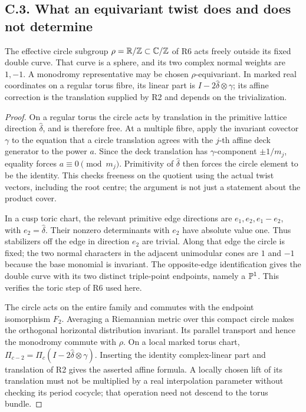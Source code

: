 

\subsection{C.3. What an equivariant twist does and does not determine}

\begin{proposition}
The effective circle subgroup $\rho=\mathbb R/\mathbb Z\subset\mathbb C/\mathbb Z$ of R6
acts freely outside its fixed double curve. That curve is a sphere,
and its two complex normal weights are $1,-1$. A monodromy
representative may be chosen $\rho$-equivariant. In marked real
coordinates on a regular torus fibre, its linear part is
$I-2\widehat\delta\otimes\gamma$; its affine correction is the
translation supplied by R2 and depends on the trivialization.
\end{proposition}

\begin{proof}
On a regular torus the circle acts by translation in the primitive
lattice direction $\widehat\delta$, and is therefore free.
At a multiple fibre, apply the invariant covector $\gamma$ to the
equation that a circle translation agrees with the $j$-th affine
deck generator to the power $a$. Since the deck translation has
$\gamma$-component $\pm1/m_j$, equality forces
$a\equiv0\pmod{m_j}$. Primitivity of $\widehat\delta$ then
forces the circle element to be the identity. This checks freeness
on the quotient using the actual twist vectors, including the root
centre; the argument is not just a statement about the product cover.

In a cusp toric chart, the relevant primitive edge directions are
$e_1,e_2,e_1-e_2$, with $e_2=\widehat\delta$.
Their nonzero determinants with $e_2$ have absolute value one.
Thus stabilizers off the edge in direction $e_2$ are trivial. Along
that edge the circle is fixed; the two normal characters in the
adjacent unimodular cones are $1$ and $-1$ because the base monomial
is invariant. The opposite-edge identification gives the double
curve with its two distinct triple-point endpoints, namely a
$\mathbb P^1$. This verifies the toric step of R6 used here.

The circle acts on the entire family and commutes with the endpoint
isomorphism $F_2$. Averaging a Riemannian metric over this compact
circle makes the orthogonal horizontal distribution invariant.
Its parallel transport and hence the monodromy commute with $\rho$.
On a local marked torus chart,
$\Pi_{c-2}=\Pi_c(I-2\widehat\delta\otimes\gamma)$.
Inserting the identity complex-linear part and translation of R2
gives the asserted affine formula. A locally chosen lift of its
translation must not be multiplied by a real interpolation parameter
without checking its period cocycle; that operation need not descend
to the torus bundle.
\end{proof}

